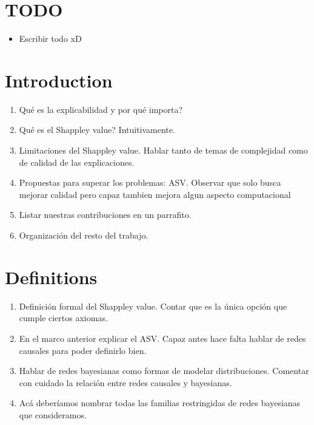 \documentclass{llncs}
\begin{document}
\vspace{0.5cm}
\setcounter{page}{1}

%
\section*{TODO}

\begin{itemize}
    \item Escribir todo xD
\end{itemize}

\section{Introduction}

\begin{enumerate}
    \item Qué es la explicabilidad y por qué importa?
    \item Qué es el Shappley value? Intuitivamente.
    \item Limitaciones del Shappley value. Hablar tanto de temas de complejidad como de calidad de las explicaciones.
    \item Propuestas para superar los problemas: ASV. Observar que solo busca mejorar calidad pero capaz tambien mejora algun aspecto computacional
    \item Listar nuestras contribuciones en un parrafito.
    \item Organización del resto del trabajo.
\end{enumerate}

\section{Definitions}

\begin{enumerate}
    \item Definición formal del Shappley value. Contar que es la única opción que cumple ciertos axiomas.
    \item En el marco anterior explicar el ASV. Capaz antes hace falta hablar de redes causales para poder definirlo bien.
    \item Hablar de redes bayesianas como formas de modelar distribuciones. Comentar con cuidado la relación entre redes causales y bayesianas.
    \item Acá deberíamos nombrar todas las familias restringidas de redes bayesianas que consideramos.
\end{enumerate}
\end{document}
